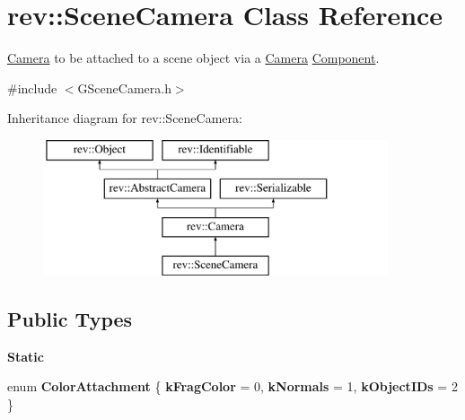 \hypertarget{classrev_1_1_scene_camera}{}\section{rev\+::Scene\+Camera Class Reference}
\label{classrev_1_1_scene_camera}


\mbox{\hyperlink{classrev_1_1_camera}{Camera}} to be attached to a scene object via a \mbox{\hyperlink{classrev_1_1_camera}{Camera}} \mbox{\hyperlink{classrev_1_1_component}{Component}}.  




{\ttfamily \#include $<$G\+Scene\+Camera.\+h$>$}

Inheritance diagram for rev\+::Scene\+Camera\+:\begin{figure}[H]
\begin{center}
\leavevmode
\includegraphics[height=4.000000cm]{classrev_1_1_scene_camera}
\end{center}
\end{figure}
\subsection*{Public Types}
\begin{Indent}\textbf{ Static}\par
\begin{DoxyCompactItemize}
\item 
\mbox{\label{classrev_1_1_scene_camera_aee99834c6a8bdc017a7905af8dddd7e6}} 
enum {\bfseries Color\+Attachment} \{ {\bfseries k\+Frag\+Color} = 0, 
{\bfseries k\+Normals} = 1, 
{\bfseries k\+Object\+I\+Ds} = 2
 \}
\end{DoxyCompactItemize}
\end{Indent}
